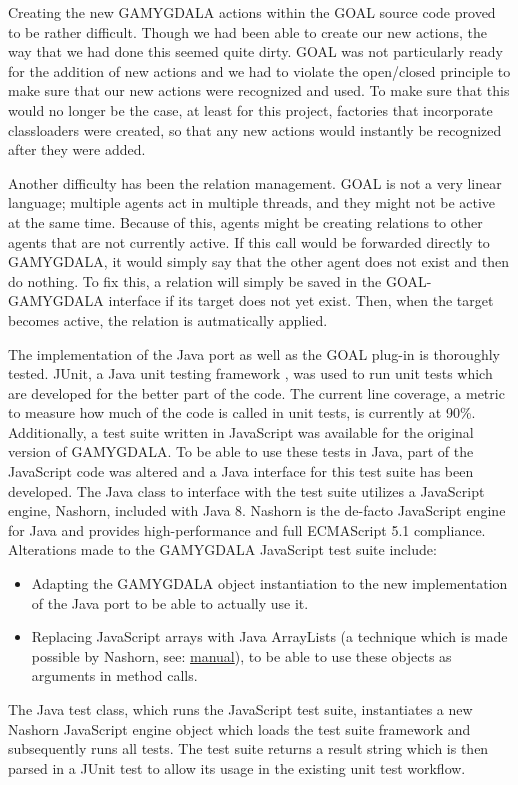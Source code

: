 Creating the new GAMYGDALA actions within the GOAL source code proved to be rather difficult. Though we had been able to create our new actions, the way that we had done this seemed quite dirty. GOAL was not particularly ready for the addition of new actions and we had to violate the open/closed principle to make sure that our new actions were recognized and used. To make sure that this would no longer be the case, at least for this project, factories that incorporate classloaders were created, so that any new actions would instantly be recognized after they were added.

Another difficulty has been the relation management. GOAL is not a very linear language; multiple agents act in multiple threads, and they might not be active at the same time. Because of this, agents might be creating relations to other agents that are not currently active. If this call would be forwarded directly to GAMYGDALA, it would simply say that the other agent does not exist and then do nothing. To fix this, a relation will simply be saved in the GOAL-GAMYGDALA interface if its target does not yet exist. Then, when the target becomes active, the relation is autmatically applied.

The implementation of the Java port as well as the GOAL plug-in is thoroughly tested. JUnit, a Java unit testing framework \citep{junit}, was used to run unit tests which are developed for the better part of the code. The current line coverage, a metric to measure how much of the code is called in unit tests, is currently at 90\%. Additionally, a test suite written in JavaScript was available for the original version of GAMYGDALA. To be able to use these tests in Java, part of the JavaScript code was altered and a Java interface for this test suite has been developed. The Java class to interface with the test suite utilizes a JavaScript engine, Nashorn, included with Java 8. Nashorn is the de-facto JavaScript engine for Java and provides high-performance \citep{projnashorn} and full ECMAScript 5.1 compliance. Alterations made to the GAMYGDALA JavaScript test suite include:
\begin{itemize}
\item Adapting the GAMYGDALA object instantiation to the new implementation of the Java port to be able to actually use it.
\item Replacing JavaScript arrays with Java ArrayLists (a technique which is made possible by Nashorn, see: \href{http://docs.oracle.com/javase/8/docs/technotes/guides/scripting/prog_guide/javascript.html#A1147187}{manual}), to be able to use these objects as arguments in method calls.
\end{itemize}
The Java test class, which runs the JavaScript test suite, instantiates a new Nashorn JavaScript engine object which loads the test suite framework and subsequently runs all tests. The test suite returns a result string which is then parsed in a JUnit test to allow its usage in the existing unit test workflow.

